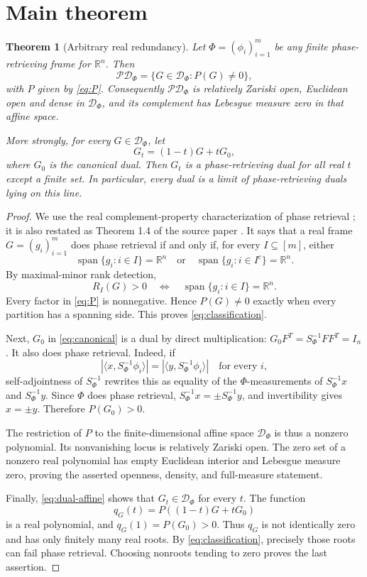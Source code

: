 \documentclass[11pt]{article}
\newtheorem{theorem}{Theorem}
\newcommand{\R}{\mathbb R}
\newcommand{\cD}{\mathcal D}
\newcommand{\cP}{\mathcal P}
\begin{document}
\section{Main theorem}

\begin{theorem}[Arbitrary real redundancy]\label{thm:main}
Let $\Phi=(\phi_i)_{i=1}^m$ be any finite phase-retrieving frame for $\R^n$.
Then
\begin{equation}\label{eq:classification}
 \cP\cD_\Phi=\{G\in\cD_\Phi:P(G)\ne0\},
\end{equation}
with $P$ given by \eqref{eq:P}.  Consequently $\cP\cD_\Phi$ is relatively
Zariski open, Euclidean open and dense in $\cD_\Phi$, and its complement has
Lebesgue measure zero in that affine space.

More strongly, for every $G\in\cD_\Phi$, let
\[
 G_t=(1-t)G+tG_0,
\]
where $G_0$ is the canonical dual.  Then $G_t$ is a phase-retrieving dual for
all real $t$ except a finite set.  In particular, every dual is a limit of
phase-retrieving duals lying on this line.
\end{theorem}

\begin{proof}
We use the real complement-property characterization of phase retrieval
\cite[Theorem~2.8]{BCE}; it is also restated as Theorem 1.4 of the source
paper \cite[p.~3]{source}.  It says that a real frame $G=(g_i)_{i=1}^m$ does
phase retrieval if and only if, for every $I\subseteq[m]$, either
\[
 \operatorname{span}\{g_i:i\in I\}=\R^n
 \quad\text{or}\quad
 \operatorname{span}\{g_i:i\in I^c\}=\R^n.
\]
By maximal-minor rank detection,
\[
 R_I(G)>0
 \quad\Longleftrightarrow\quad
 \operatorname{span}\{g_i:i\in I\}=\R^n.
\]
Every factor in \eqref{eq:P} is nonnegative.  Hence $P(G)\ne0$ exactly when
every partition has a spanning side.  This proves \eqref{eq:classification}.

Next, $G_0$ in \eqref{eq:canonical} is a dual by direct multiplication:
$G_0F^T=S_\Phi^{-1}FF^T=I_n$.  It also does phase retrieval.  Indeed,
if
\[
 |\langle x,S_\Phi^{-1}\phi_i\rangle|
 =|\langle y,S_\Phi^{-1}\phi_i\rangle|
 \quad\text{for every }i,
\]
self-adjointness of $S_\Phi^{-1}$ rewrites this as equality of the
$\Phi$-measurements of $S_\Phi^{-1}x$ and $S_\Phi^{-1}y$.  Since $\Phi$ does
phase retrieval,
$S_\Phi^{-1}x=\pm S_\Phi^{-1}y$, and invertibility gives $x=\pm y$.
Therefore $P(G_0)>0$.

The restriction of $P$ to the finite-dimensional affine space $\cD_\Phi$ is
thus a nonzero polynomial.  Its nonvanishing locus is relatively Zariski
open.  The zero set of a nonzero real polynomial has empty Euclidean interior
and Lebesgue measure zero, proving the asserted openness, density, and
full-measure statement.

Finally, \eqref{eq:dual-affine} shows that $G_t\in\cD_\Phi$ for every $t$.
The function
\[
 q_G(t)=P((1-t)G+tG_0)
\]
is a real polynomial, and $q_G(1)=P(G_0)>0$.  Thus $q_G$ is not identically
zero and has only finitely many real roots.  By
\eqref{eq:classification}, precisely those roots can fail phase retrieval.
Choosing nonroots tending to zero proves the last assertion.
\end{proof}
\end{document}
